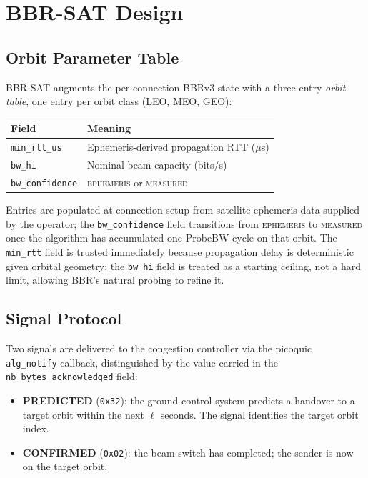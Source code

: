 \documentclass[conference]{IEEEtran}
\begin{document}
\section{BBR-SAT Design}
\label{sec:design}

\subsection{Orbit Parameter Table}

BBR-SAT augments the per-connection BBRv3 state with a three-entry
\emph{orbit table}, one entry per orbit class (LEO, MEO, GEO):

\begin{center}
\small
\setlength{\tabcolsep}{4pt}
\begin{tabular}{ll}
\toprule
Field & Meaning \\
\midrule
\texttt{min\_rtt\_us}   & Ephemeris-derived propagation RTT ($\mu$s) \\
\texttt{bw\_hi}         & Nominal beam capacity (bits/s) \\
\texttt{bw\_confidence} & \textsc{ephemeris} or \textsc{measured} \\
\bottomrule
\end{tabular}
\end{center}

Entries are populated at connection setup from satellite ephemeris data
supplied by the operator; the \texttt{bw\_confidence} field transitions
from \textsc{ephemeris} to \textsc{measured} once the algorithm has
accumulated one ProbeBW cycle on that orbit.
The \texttt{min\_rtt} field is trusted immediately because propagation delay
is deterministic given orbital geometry; the \texttt{bw\_hi} field is
treated as a starting ceiling, not a hard limit, allowing BBR's natural
probing to refine it.

\subsection{Signal Protocol}

Two signals are delivered to the congestion controller via the picoquic
\texttt{alg\_notify} callback, distinguished by the value carried in the
\texttt{nb\_bytes\_acknowledged} field:

\begin{itemize}
  \item \textbf{PREDICTED} (\texttt{0x32}): the ground control system
        predicts a handover to a target orbit within the next $\ell$ seconds.
        The signal identifies the target orbit index.
  \item \textbf{CONFIRMED} (\texttt{0x02}): the beam switch has completed;
        the sender is now on the target orbit.
\end{itemize}
\end{document}
